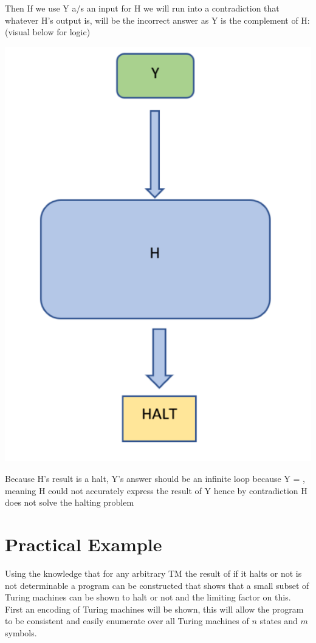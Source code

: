 \documentclass[journal,12pt,onecolumn,draftclsnofoot,]{IEEEtran}
\begin{document}
Then If we use Y a/s an input for H we will run into a contradiction that whatever H’s output is, will be the incorrect answer as Y is the complement of H: (visual below for logic) 

\begin{center}
  \includegraphics[scale=0.3]{3}
\end{center} 

Because H’s result is a halt, Y’s answer should be an infinite loop because Y =  , meaning H could not accurately express the result of Y hence by contradiction H does not solve the halting problem

\section{Practical Example}

Using the knowledge that for any arbitrary TM the result of if it halts or not is not
determinable a program can be constructed that shows that a small subset of Turing machines
can be shown to halt or not and the limiting factor on this. First an encoding of Turing 
machines will be shown, this will allow the program to be consistent and easily enumerate 
over all Turing machines of $n$ states and $m$ symbols.
\end{document}
